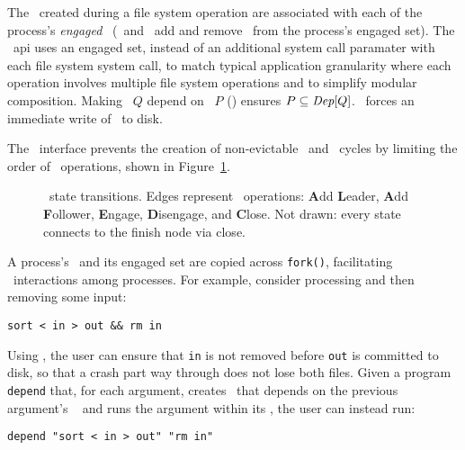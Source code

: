 The \chdescs\ created during a file system operation are associated
with each of the process's \emph{engaged} \opgroups\ (\opgroupEngage\
and \opgroupDisengage\ add and remove \anopgroup\ from the process's
engaged set).
%
The \opgroup\ api uses an engaged set, instead of an additional system
call paramater with each file system system call, to match typical
application granularity where each operation involves multiple file
system operations and to simplify modular composition.
%
Making \opgroup\ $Q$ depend on \opgroup\ $P$ (\opgroupAddDepend)
ensures \(P \subseteq \textit{Dep}[Q]\).
%
\opgroupSync\ forces an immediate write of \anopgroup\ to disk.

The \opgroup\ interface prevents the creation of non-evictable
\chdescs\ and \chdesc\ cycles by limiting the order of \opgroup\
operations, shown in Figure~\ref{fig:opgroup-transitions-states}.

\begin{figure}[htb]
\vspace{-0.5\baselineskip}
\vspace{-0.5\baselineskip}
\caption{\label{fig:opgroup-transitions-states} \Opgroup\ state
  transitions. Edges represent \opgroup\ operations: \textbf{A}dd
  \textbf{L}eader, \textbf{A}dd \textbf{F}ollower,
  \textbf{E}ngage, \textbf{D}isengage, and \textbf{C}lose.
  Not drawn: every state connects to the finish node via close.}
\end{figure}

A process's \opgroups\ and its engaged set are copied across \texttt{fork()},
facilitating \opgroup\ interactions among processes.
%
For example, consider processing and then removing some input:
%
\vspace{-0.5\baselineskip}
\begin{center}
\begin{small}
\verb+sort < in > out && rm in+
\end{small}
\end{center}
\vspace{-0.5\baselineskip}
%
Using \opgroups, the user can ensure that \texttt{in} is not removed
before \texttt{out} is committed to disk, so that a crash part way
through does not lose both files.
%
Given a program \texttt{depend} that, for each argument,
%
creates \anopgroup\ that depends on the previous argument's \opgroup\
%
and runs the argument within its \opgroup,
%
the user can instead run:
%
\vspace{-0.5\baselineskip}
\begin{center}
\begin{small}
\verb+depend "sort < in > out" "rm in"+
\end{small}
\end{center}
\vspace{-0.5\baselineskip}

